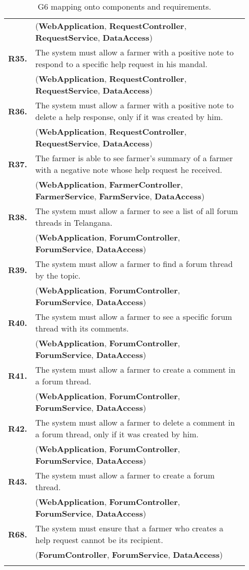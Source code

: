 \begin{longtable}{p{0.06\linewidth} p{0.88\linewidth}}
	& (\textbf{WebApplication}, \textbf{RequestController}, \textbf{RequestService}, \textbf{DataAccess})\\
	\textbf{R35.} & The system must allow a farmer with a positive note to respond to a specific help request in his mandal.\\
	& (\textbf{WebApplication}, \textbf{RequestController}, \textbf{RequestService}, \textbf{DataAccess})\\
	\textbf{R36.} & The system must allow a farmer with a positive note to delete a help response, only if it was created by him.\\
	& (\textbf{WebApplication}, \textbf{RequestController}, \textbf{RequestService}, \textbf{DataAccess})\\
	\textbf{R37.} & The farmer is able to see farmer's summary of a farmer with a negative note whose help request he received. \\
	& (\textbf{WebApplication}, \textbf{FarmerController}, \textbf{FarmerService}, \textbf{FarmService}, \textbf{DataAccess})\\
	\textbf{R38.} & The system must allow a farmer to see a list of all forum threads in Telangana.\\
	& (\textbf{WebApplication}, \textbf{ForumController}, \textbf{ForumService}, \textbf{DataAccess})\\
	\textbf{R39.} & The system must allow a farmer to find a forum thread by the topic.\\
	& (\textbf{WebApplication}, \textbf{ForumController}, \textbf{ForumService}, \textbf{DataAccess})\\
	\textbf{R40.} & The system must allow a farmer to see a specific forum thread with its comments.\\
	& (\textbf{WebApplication}, \textbf{ForumController}, \textbf{ForumService}, \textbf{DataAccess})\\
	\textbf{R41.} & The system must allow a farmer to create a comment in a forum thread.\\
	& (\textbf{WebApplication}, \textbf{ForumController}, \textbf{ForumService}, \textbf{DataAccess})\\
	\textbf{R42.} & The system must allow a farmer to delete a comment in a forum thread, only if it was created by him.\\
	& (\textbf{WebApplication}, \textbf{ForumController}, \textbf{ForumService}, \textbf{DataAccess})\\
	\textbf{R43.} & The system must allow a farmer to create a forum thread.\\
	& (\textbf{WebApplication}, \textbf{ForumController}, \textbf{ForumService}, \textbf{DataAccess})\\
	\textbf{R68.} & The system must ensure that a farmer who creates a help request cannot be its recipient.\\
	& (\textbf{ForumController}, \textbf{ForumService}, \textbf{DataAccess})\\
	
    \bottomrule
    \caption{G6 mapping onto components and requirements.}
\end{longtable}





